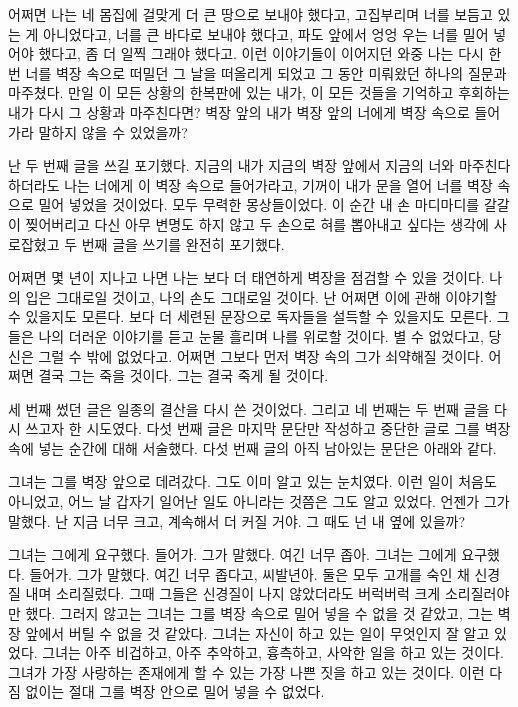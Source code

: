 어쩌면 나는 네 몸집에 걸맞게 더 큰 땅으로 보내야 했다고, 고집부리며 너를 보듬고 있는 게 아니었다고, 너를 큰 바다로 보내야 했다고, 파도 앞에서 엉엉 우는 너를 밀어 넣어야 했다고, 좀 더 일찍 그래야 했다고. 이런 이야기들이 이어지던 와중 나는 다시 한 번 너를 벽장 속으로 떠밀던 그 날을 떠올리게 되었고 그 동안 미뤄왔던 하나의 질문과 마주쳤다. 만일 이 모든 상황의 한복판에 있는 내가, 이 모든 것들을 기억하고 후회하는 내가 다시 그 상황과 마주친다면? 벽장 앞의 내가 벽장 앞의 너에게 벽장 속으로 들어가라 말하지 않을 수 있었을까?



난 두 번째 글을 쓰길 포기했다. 지금의 내가 지금의 벽장 앞에서 지금의 너와 마주친다 하더라도 나는 너에게 이 벽장 속으로 들어가라고, 기꺼이 내가 문을 열어 너를 벽장 속으로 밀어 넣었을 것이었다. 모두 무력한 몽상들이었다. 이 순간 내 손 마디마디를 갈갈이 찢어버리고 다신 아무 변명도 하지 않고 두 손으로 혀를 뽑아내고 싶다는 생각에 사로잡혔고 두 번째 글을 쓰기를 완전히 포기했다.



어쩌면 몇 년이 지나고 나면 나는 보다 더 태연하게 벽장을 점검할 수 있을 것이다. 나의 입은 그대로일 것이고, 나의 손도 그대로일 것이다. 난 어쩌면 이에 관해 이야기할 수 있을지도 모른다. 보다 더 세련된 문장으로 독자들을 설득할 수 있을지도 모른다. 그들은 나의 더러운 이야기를 듣고 눈물 흘리며 나를 위로할 것이다. 별 수 없었다고, 당신은 그럴 수 밖에 없었다고. 어쩌면 그보다 먼저 벽장 속의 그가 쇠약해질 것이다. 어쩌면 결국 그는 죽을 것이다. 그는 결국 죽게 될 것이다.



세 번째 썼던 글은 일종의 결산을 다시 쓴 것이었다. 그리고 네 번째는 두 번째 글을 다시 쓰고자 한 시도였다. 다섯 번째 글은 마지막 문단만 작성하고 중단한 글로 그를 벽장 속에 넣는 순간에 대해 서술했다. 다섯 번째 글의 아직 남아있는 문단은 아래와 같다.



그녀는 그를 벽장 앞으로 데려갔다. 그도 이미 알고 있는 눈치였다. 이런 일이 처음도 아니었고, 어느 날 갑자기 일어난 일도 아니라는 것쯤은 그도 알고 있었다. 언젠가 그가 말했다. 난 지금 너무 크고, 계속해서 더 커질 거야. 그 때도 넌 내 옆에 있을까?



그녀는 그에게 요구했다. 들어가. 그가 말했다. 여긴 너무 좁아. 그녀는 그에게 요구했다. 들어가. 그가 말했다. 여긴 너무 좁다고, 씨발년아. 둘은 모두 고개를 숙인 채 신경질 내며 소리질렀다. 그때 그들은 신경질이 나지 않았더라도 버럭버럭 크게 소리질러야만 했다. 그러지 않고는 그녀는 그를 벽장 속으로 밀어 넣을 수 없을 것 같았고, 그는 벽장 앞에서 버틸 수 없을 것 같았다. 그녀는 자신이 하고 있는 일이 무엇인지 잘 알고 있었다. 그녀는 아주 비겁하고, 아주 추악하고, 흉측하고, 사악한 일을 하고 있는 것이다. 그녀가 가장 사랑하는 존재에게 할 수 있는 가장 나쁜 짓을 하고 있는 것이다. 이런 다짐 없이는 절대 그를 벽장 안으로 밀어 넣을 수 없었다.



